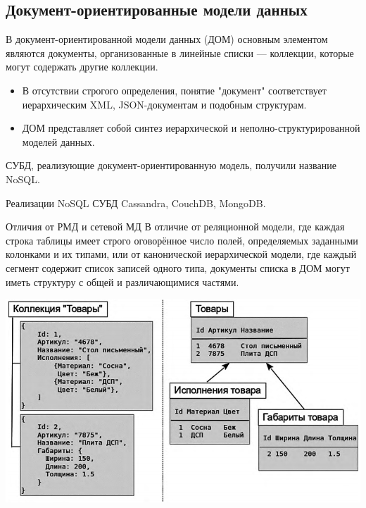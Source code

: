 \documentclass{beamer}
\begin{document}
\subsection{Документ-ориентированные модели данных}
\begin{frame} 
\begin{block}{В документ-ориентированной модели данных (ДОМ)}
основным элементом являются документы, организованные в линейные списки — коллекции, которые могут
содержать другие коллекции.
\end{block}
\begin{itemize}
\item В отсутствии строгого определения, понятие "документ" соответствует иерархическим
XML, JSON-документам и подобным структурам.
\item ДОМ представляет собой синтез иерархической и неполно-структурированной моделей данных.
\end{itemize}
СУБД, реализующие документ-ориентированную модель, получили название NoSQL.
\begin{block}{Реализации NoSQL СУБД}
Cassandra, CouchDB, MongoDB.
\end{block}
\end{frame}

\begin{frame} 
\begin{block}{Отличия от РМД и сетевой МД}
В отличие от реляционной модели, где каждая строка таблицы имеет строго оговорённое число полей, определяемых заданными колонками и их типами, или от канонической иерархической модели, где каждый сегмент содержит список записей одного типа, документы списка в ДОМ могут иметь структуру с общей и различающимися частями.
\end{block}
\begin{center}
\includegraphics[scale=0.35]{images/dom-01.png}
\end{center}
\end{frame}
\end{document}
